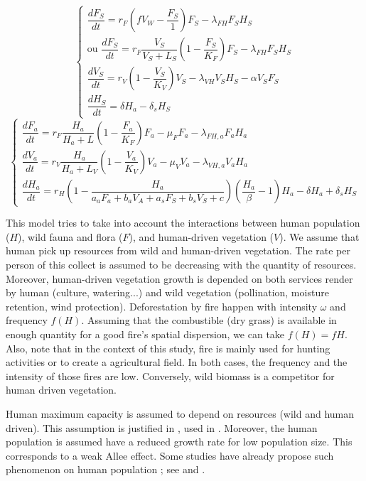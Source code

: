 \documentclass{article}
\begin{document}
\[
\left\{ \begin{array}{l}
\dfrac{dF_{S}}{dt}=r_{F}\left(fV_W-\dfrac{F_{S}}{1}\right)F_{S}-\lambda_{FH}F_{S}H_{S}\\
\mbox{ou }\dfrac{dF_{S}}{dt}=r_{F}\dfrac{V_{S}}{V_{S}+L_{S}}\left(1-\dfrac{F_{S}}{K_{F}}\right)F_{S}-\lambda_{FH}F_{S}H_{S}\\
\dfrac{dV_{S}}{dt}=r_{V}\left(1-\dfrac{V_{S}}{K_{V}}\right)V_{S}-\lambda_{VH}V_{S}H_{S}-\alpha V_{S}F_{S}\\
\dfrac{dH_{S}}{dt}=\delta H_{a}-\delta_{s}H_{S}
\end{array}\right.
\]
\[
\left\{ \begin{array}{l}
\dfrac{dF_{a}}{dt}=r_{F}\dfrac{H_{a}}{H_{a}+L}\left(1-\dfrac{F_{a}}{K_{F}}\right)F_{a}-\mu_{F}F_{a}-\lambda_{FH,a}F_{a}H_{a}\\
\dfrac{dV_{a}}{dt}=r_{V}\dfrac{H_{a}}{H_{a}+L_{V}}\left(1-\dfrac{V_{a}}{K_{V}}\right)V_{a}-\mu_{V}V_{a}-\lambda_{VH,a}V_{a}H_{a}\\
\dfrac{dH_{a}}{dt}=r_{H}\left(1-\dfrac{H_{a}}{a_{a}F_{a}+b_{a}V_{A}+a_{s}F_{S}+b_{s}V_{S}+c}\right)\left(\dfrac{H_{a}}{\beta}-1\right)H_{a}-\delta H_{a}+\delta_{s}H_{S}
\end{array}\right.
\]



This model tries to take into account the interactions between human population ($H$), wild fauna and flora ($F$), and human-driven vegetation ($V$). 
We assume that human pick up resources from wild and human-driven vegetation. The rate per person of this collect is assumed to be decreasing with the quantity of resources.
Moreover, human-driven vegetation growth is depended on both services render by human (culture, watering...) and wild vegetation (pollination, moisture retention, wind protection). 
Deforestation by fire happen with intensity $\omega$ and frequency $f(H)$. Assuming that the combustible (dry grass) is available in enough quantity for a good fire's spatial dispersion, we can take $f(H) = fH$. Also, note that in the context of this study, fire is mainly used for hunting activities or to create a agricultural field. In both cases, the frequency and the intensity of those fires are low.
Conversely, wild biomass is a competitor for human driven vegetation.

Human maximum capacity is assumed to depend on resources (wild and human driven). This assumption is justified in \cite{fanta_equilibrium_2018}, used in \cite{bengochea_paz_agricultural_2020}.
Moreover, the human population is assumed have a reduced growth rate for low population size. This corresponds to a weak Allee effect. Some studies have already propose such phenomenon on human population ; see \cite{hamilton_human_2012} and \cite{vaesen_inbreeding_2019}.
\end{document}
